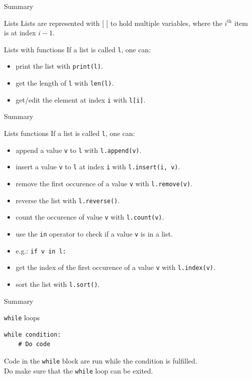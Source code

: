 \documentclass[dvipsnames, svgnames, x11names]{beamer}
\begin{document}
\begin{frame}[fragile]{Summary}
\vspace{-6pt}
\begin{block}{Lists}
Lists are represented with [ ] to hold multiple variables, where the $i^{\text{th}}$ item is at index $i - 1$.\\
\end{block}
\begin{block}{Lists with functions}
If a list is called \texttt{l}, one can:
\begin{itemize}
    \item print the list with \texttt{print(l)}.
    \item get the length of \texttt{l} with \texttt{len(l)}.
    \item get/edit the element at index \texttt{i} with \texttt{l[i]}.
\end{itemize}
\end{block}
\end{frame}

\begin{frame}[fragile]{Summary}
\begin{block}{Lists functions}
If a list is called \texttt{l}, one can:
\begin{itemize}
    \item append a value \texttt{v} to \texttt{l} with \texttt{l.append(v)}.
    \item insert a value \texttt{v} to \texttt{l} at index \texttt{i} with \texttt{l.insert(i, v)}.
    \item remove the first occurence of a value \texttt{v} with \texttt{l.remove(v)}.
    \item reverse the list with \texttt{l.reverse()}.
    \item count the occurence of value \texttt{v} with \texttt{l.count(v)}.
    \item use the \texttt{in} operator to check if a value \texttt{v} is in a list.
    \item[] e.g.: \texttt{if v in l:}
    \item get the index of the first occurence of a value \texttt{v} with \texttt{l.index(v)}.
    \item sort the list with \texttt{l.sort()}.
\end{itemize}
\end{block}
\end{frame}

\begin{frame}[fragile]{Summary}
\begin{block}{\texttt{while} loops}
\begin{verbatim}
while condition:
    # Do code
\end{verbatim}
Code in the \texttt{while} block are run while the condition is fulfilled.\\
Do make sure that the \texttt{while} loop can be exited.
\end{block}
\end{frame}
\end{document}

